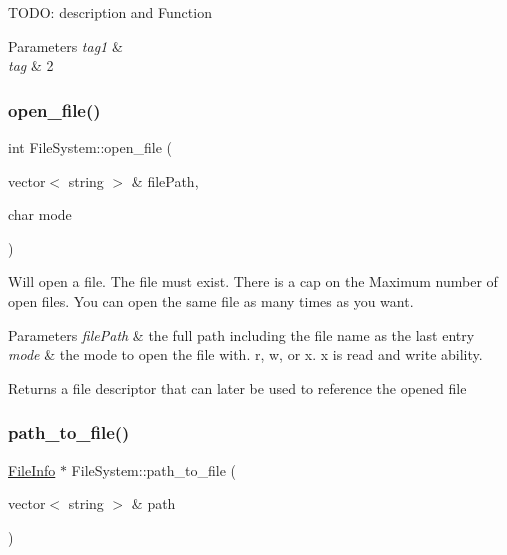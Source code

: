 T\+O\+DO\+: description and Function 
\begin{DoxyParams}{Parameters}
{\em tag1} & \\
\hline
{\em tag} & 2 \\
\hline
\end{DoxyParams}
\mbox{\label{classFileSystem_a661ae7deb6fb32cdd7d631dfadb8c983}} 
\subsubsection{\texorpdfstring{open\+\_\+file()}{open\_file()}}
{\footnotesize\ttfamily int File\+System\+::open\+\_\+file (\begin{DoxyParamCaption}\item[{vector$<$ string $>$ \&}]{file\+Path,  }\item[{char}]{mode }\end{DoxyParamCaption})}

Will open a file. The file must exist. There is a cap on the Maximum number of open files. You can open the same file as many times as you want. 
\begin{DoxyParams}{Parameters}
{\em file\+Path} & the full path including the file name as the last entry \\
\hline
{\em mode} & the mode to open the file with. r, w, or x. x is read and write ability. \\
\hline
\end{DoxyParams}
\begin{DoxyReturn}{Returns}
a file descriptor that can later be used to reference the opened file 
\end{DoxyReturn}
\mbox{\label{classFileSystem_a6c6e95f60417b02601b72e951e7108f8}} 
\subsubsection{\texorpdfstring{path\+\_\+to\+\_\+file()}{path\_to\_file()}}
{\footnotesize\ttfamily \mbox{\hyperlink{classFileInfo}{File\+Info}} $\ast$ File\+System\+::path\+\_\+to\+\_\+file (\begin{DoxyParamCaption}\item[{vector$<$ string $>$ \&}]{path }\end{DoxyParamCaption})}

